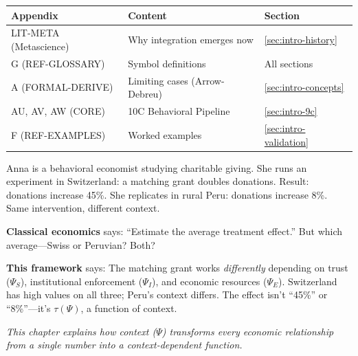 \begin{tcolorbox}[
    colback=yellow!10!white,
    colframe=orange!75!black,
    title={\textbf{Appendix References for This Chapter}},
    fonttitle=\bfseries
]
\small
\begin{tabular}{@{}p{3.5cm}p{5.5cm}p{3.5cm}@{}}
\textbf{Appendix} & \textbf{Content} & \textbf{Section} \\
\midrule
LIT-META (Metascience) & Why integration emerges now & \ref{sec:intro-history} \\
G (REF-GLOSSARY) & Symbol definitions & All sections \\
A (FORMAL-DERIVE) & Limiting cases (Arrow-Debreu) & \ref{sec:intro-concepts} \\
AU, AV, AW (CORE) & 10C Behavioral Pipeline & \ref{sec:intro-9c} \\
F (REF-EXAMPLES) & Worked examples & \ref{sec:intro-validation}
\end{tabular}
\end{tcolorbox}

\begin{tcolorbox}[colback=gray!5!white, colframe=gray!75!black,
    title=\textbf{Why This Matters: Anna's Dilemma}]
\small
Anna is a behavioral economist studying charitable giving. She runs an experiment in Switzerland: a matching grant doubles donations. Result: donations increase 45\%. She replicates in rural Peru: donations increase 8\%. Same intervention, different context.

\textbf{Classical economics} says: ``Estimate the average treatment effect.'' But which average---Swiss or Peruvian? Both?

\textbf{This framework} says: The matching grant works \emph{differently} depending on trust ($\Psi_S$), institutional enforcement ($\Psi_I$), and economic resources ($\Psi_E$). Switzerland has high values on all three; Peru's context differs. The effect isn't ``45\%'' or ``8\%''---it's $\tau(\Psi)$, a function of context.

\textit{This chapter explains how context ($\Psi$) transforms every economic relationship from a single number into a context-dependent function.}
\end{tcolorbox}

